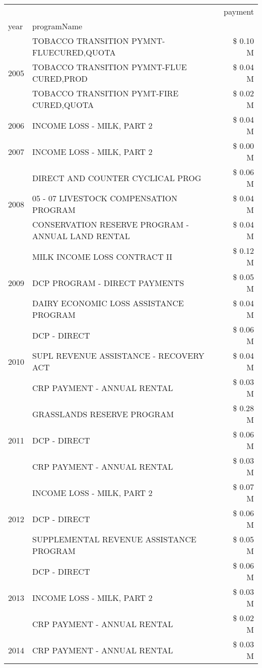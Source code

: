 \begin{tabular}{llr}
\toprule
 &  & payment \\
year & programName &  \\
\midrule
\multirow[t]{3}{*}{2005} & TOBACCO TRANSITION PYMNT-FLUECURED,QUOTA & \$ 0.10 M \\
 & TOBACCO TRANSITION PYMNT-FLUE CURED,PROD & \$ 0.04 M \\
 & TOBACCO TRANSITION PYMT-FIRE CURED,QUOTA & \$ 0.02 M \\
\cline{1-3}
2006 & INCOME LOSS - MILK, PART 2 & \$ 0.04 M \\
\cline{1-3}
2007 & INCOME LOSS - MILK, PART 2 & \$ 0.00 M \\
\cline{1-3}
\multirow[t]{3}{*}{2008} & DIRECT AND COUNTER CYCLICAL PROG & \$ 0.06 M \\
 & 05 - 07 LIVESTOCK COMPENSATION PROGRAM & \$ 0.04 M \\
 & CONSERVATION RESERVE PROGRAM - ANNUAL LAND RENTAL & \$ 0.04 M \\
\cline{1-3}
\multirow[t]{3}{*}{2009} & MILK INCOME LOSS CONTRACT II & \$ 0.12 M \\
 & DCP PROGRAM - DIRECT PAYMENTS & \$ 0.05 M \\
 & DAIRY ECONOMIC LOSS ASSISTANCE PROGRAM & \$ 0.04 M \\
\cline{1-3}
\multirow[t]{3}{*}{2010} & DCP - DIRECT & \$ 0.06 M \\
 & SUPL REVENUE ASSISTANCE - RECOVERY ACT & \$ 0.04 M \\
 & CRP PAYMENT - ANNUAL RENTAL & \$ 0.03 M \\
\cline{1-3}
\multirow[t]{3}{*}{2011} & GRASSLANDS RESERVE PROGRAM & \$ 0.28 M \\
 & DCP - DIRECT & \$ 0.06 M \\
 & CRP PAYMENT - ANNUAL RENTAL & \$ 0.03 M \\
\cline{1-3}
\multirow[t]{3}{*}{2012} & INCOME LOSS - MILK, PART 2 & \$ 0.07 M \\
 & DCP - DIRECT & \$ 0.06 M \\
 & SUPPLEMENTAL REVENUE ASSISTANCE PROGRAM & \$ 0.05 M \\
\cline{1-3}
\multirow[t]{3}{*}{2013} & DCP - DIRECT & \$ 0.06 M \\
 & INCOME LOSS - MILK, PART 2 & \$ 0.03 M \\
 & CRP PAYMENT - ANNUAL RENTAL & \$ 0.02 M \\
\cline{1-3}
\multirow[t]{3}{*}{2014} & CRP PAYMENT - ANNUAL RENTAL & \$ 0.03 M \\

\end{tabular}
